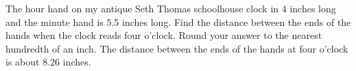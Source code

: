 { The hour hand on my antique Seth Thomas schoolhouse clock in 4 inches long and the minute hand is 5.5 inches long.  Find the distance between the ends of the hands when the clock reads four o'clock.  Round your answer to the nearest hundredth of an inch.}
{ The distance between the ends of the hands at four o'clock is about $8.26$ inches.}
